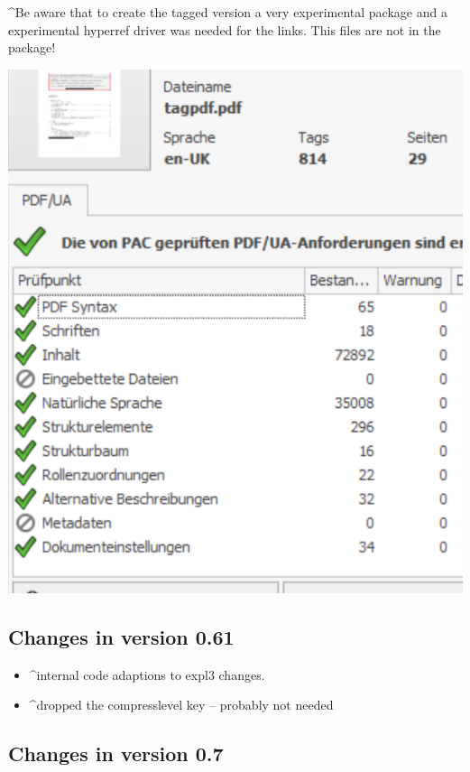 \documentclass[DIV=12,parskip=half-,bibliography=totoc]{scrartcl}
\begin{document}
\begin{tcolorbox}
\TagP^Be aware that to create the tagged version a very experimental package and a experimental hyperref driver was needed for the links. This files are not in the package!\TagPend
\end{tcolorbox}

\includegraphics{pac3}
\tagmcend\tagstructend

\subsection{Changes in version 0.61}
\begin{itemize}
\item \TagP^internal code adaptions to expl3 changes.\Pmeti
\item \TagP^dropped the compresslevel key  -- probably not needed\Pmeti
\end{itemize}

\subsection{Changes in version 0.7}
\end{document}
